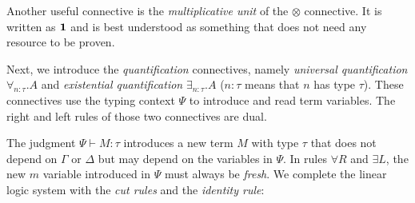 Another useful connective is the \emph{multiplicative unit} of the $\otimes$
connective. It is written as $\mathbf{1}$ and is best understood as something that
does not need any resource to be proven.



Next, we introduce the \emph{quantification} connectives, namely \emph{universal
quantification} $\forall_{n:\tau}. A$ and \emph{existential quantification}
$\exists_{n:\tau}. A$ ($n:\tau$ means that $n$ has type $\tau$).
These connectives use the typing context $\Psi$ to introduce and read term variables.
The right and left rules of those two connectives are dual.



The judgment $\Psi \vdash M : \tau$ introduces a new term $M$ with type $\tau$
that does not depend on $\Gamma$ or $\Delta$ but may depend on the variables in
$\Psi$. In rules $\forall R$ and $\exists L$, the new $m$ variable introduced in
$\Psi$ must always be \emph{fresh}. We complete the linear logic system with the
\emph{cut rules} and the \emph{identity rule}:



